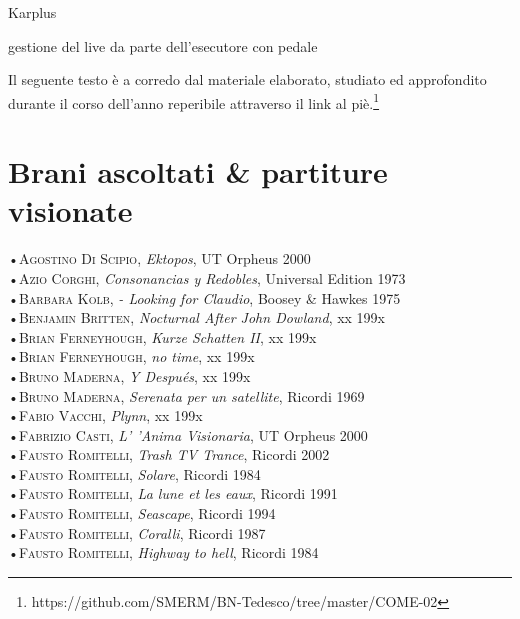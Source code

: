 \documentclass[oneside]{article}
\begin{document}
\begin{multicols*}{2}
Karplus 

gestione del live da parte dell'esecutore con pedale

Il seguente testo è a corredo dal materiale elaborato, studiato ed approfondito durante il corso dell'anno reperibile attraverso il link al piè.\footnote{https://github.com/SMERM/BN-Tedesco/tree/master/COME-02}

\newpage


\section{ Brani ascoltati \& partiture visionate}
•\textsc{\textsf {Agostino Di Scipio}}, \emph{Ektopos}, UT Orpheus 2000\\
•\textsc{\textsf {Azio Corghi}}, \emph{Consonancias y Redobles}, Universal Edition 1973\\
•\textsc{\textsf {Barbara Kolb}}, \emph{ - Looking for Claudio}, Boosey \& Hawkes 1975\\
•\textsc{\textsf {Benjamin Britten}}, \emph{Nocturnal After John Dowland}, xx 199x\\
•\textsc{\textsf {Brian Ferneyhough}}, \emph{Kurze Schatten II}, xx 199x\\
•\textsc{\textsf {Brian Ferneyhough}}, \emph{no time}, xx 199x\\
•\textsc{\textsf {Bruno Maderna}}, \emph{Y Después}, xx 199x\\
•\textsc{\textsf {Bruno Maderna}}, \emph{Serenata per un satellite}, Ricordi 1969\\
•\textsc{\textsf {Fabio Vacchi}}, \emph{Plynn}, xx 199x\\
•\textsc{\textsf {Fabrizio Casti}}, \emph{ L' 'Anima Visionaria}, UT Orpheus 2000\\
•\textsc{\textsf {Fausto Romitelli}}, \emph{Trash TV Trance}, Ricordi 2002\\
•\textsc{\textsf {Fausto Romitelli}}, \emph{Solare}, Ricordi 1984\\
•\textsc{\textsf {Fausto Romitelli}}, \emph{La lune et les eaux}, Ricordi 1991\\
•\textsc{\textsf {Fausto Romitelli}}, \emph{Seascape}, Ricordi 1994\\
•\textsc{\textsf {Fausto Romitelli}}, \emph{Coralli}, Ricordi 1987\\
•\textsc{\textsf {Fausto Romitelli}}, \emph{Highway to hell}, Ricordi 1984\\

\end{multicols*}
\end{document}

